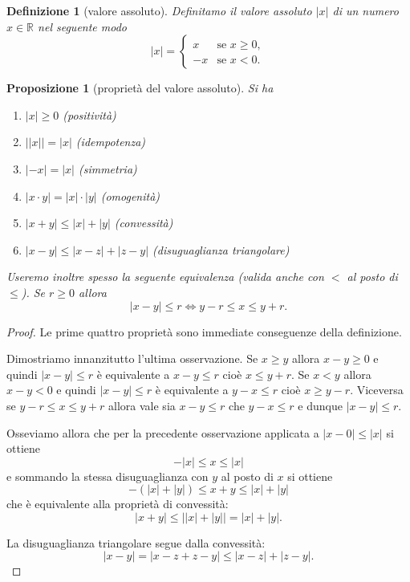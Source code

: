 \documentclass[italian,a4paper,oneside,headinclude]{scrbook}
\newcommand{\myemph}[1]{\emph{#1}\marginpar{#1}}
\newcommand{\RR}{\mathbb R}
\newcommand{\abs}[1]{{\left|#1\right|}}
\newtheorem{proposition}[theorem]{Proposizione}
\newtheorem{definition}[theorem]{Definizione}
\begin{document}
\begin{definition}[valore assoluto]
Definitamo il \myemph{valore assoluto} $\abs{x}$ di un numero $x\in \RR$ nel seguente modo
\[
\abs{x} =
\begin{cases}
  x & \text{se $x\ge 0$}, \\
  -x & \text{se $x<0 $}.
\end{cases}
\]
\end{definition}

\begin{proposition}[proprietà del valore assoluto]
Si ha
\begin{enumerate}
\item $\abs{x}\ge 0$ (positività)
\item $\big\lvert\abs{x}\big\rvert = \abs{x}$ (idempotenza)
\item $\abs{-x} = \abs{x}$ (simmetria)
\item $\abs{x\cdot y} = \abs{x}\cdot \abs{y}$ (omogenità)
\item $\abs{x+y} \le \abs{x} + \abs{y}$ (convessità)
\item $\abs{x-y} \le \abs{x-z} + \abs{z-y}$ (disuguaglianza triangolare)
\end{enumerate}
Useremo inoltre spesso la seguente equivalenza (valida
anche con $<$ al posto di $\le$). Se $r\ge 0$ allora
\[
 \abs{x-y} \le r
 \iff
 y - r \le x \le y + r.
\]
\end{proposition}
%
\begin{proof}
Le prime quattro proprietà sono immediate conseguenze della definizione.

Dimostriamo innanzitutto l'ultima osservazione.
Se $x\ge y$ allora $x-y\ge 0$ e quindi $\abs{x-y} \le r$ è
equivalente a $x-y\le r$ cioè $x\le y+r$.
Se $x<y$ allora $x-y<0$ e quindi $\abs{x-y} \le r$ è
equivalente a $y-x \le r$ cioè $x\ge y-r$.
Viceversa se $y-r \le x \le y+r$ allora vale sia $x-y \le r$ che $y-x \le r$ e dunque $\abs{x-y}\le r$.

Osseviamo allora che per la precedente osservazione applicata
a $\abs{x-0} \le \abs{x}$ si ottiene
\[
  -\abs{x} \le x \le \abs{x}
\]
e sommando la stessa disuguaglianza con $y$ al posto di $x$ si
ottiene
\[
  -(\abs{x} + \abs{y}) \le x + y \le \abs{x} + \abs{y}
\]
che è equivalente alla proprietà di convessità:
\[
  \abs{x+y} \le \big\lvert\abs{x} + \abs{y}\big\rvert = \abs{x} + \abs{y}.
\]

La disuguaglianza triangolare segue dalla convessità:
\[
 \abs{x-y} = \abs{x-z + z-y} \le \abs{x-z} + \abs{z-y}.
\]
\end{proof}
\end{document}
